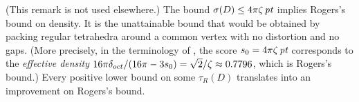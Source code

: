 \begin{remark} (This remark is not used elsewhere.)
The bound $\sigma(D)\le 4\pi\zeta\,\hbox{\it pt}$ implies Rogers's bound on
density. It is the unattainable bound that would be obtained by
packing regular tetrahedra around a common vertex with no
distortion and no gaps. (More precisely, in the terminology of
\cite{spp}, the score $s_0=4\pi \zeta\,\hbox{\it pt}$ corresponds to the
{\it effective density\/} $16\pi\delta_{oct}/(16\pi- 3 s_0)
=\sqrt{2}/\zeta \approx 0.7796$, which is Rogers's bound.)  Every
positive lower bound on some $\tau_{R}(D)$ translates into an
improvement on Rogers's bound.
\end{remark}






